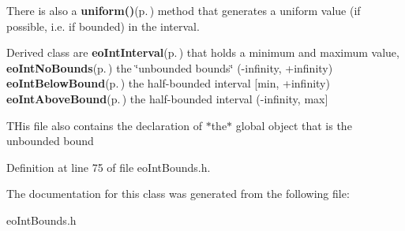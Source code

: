There is also a {\bf uniform()}{\rm (p.\,\pageref{classeo_int_bounds_a13})} method that generates a uniform value (if possible, i.e. if bounded) in the interval.

Derived class are {\bf eo\-Int\-Interval}{\rm (p.\,\pageref{classeo_int_interval})} that holds a minimum and maximum value, {\bf eo\-Int\-No\-Bounds}{\rm (p.\,\pageref{classeo_int_no_bounds})} the \char`\"{}unbounded bounds\char`\"{} (-infinity, +infinity) {\bf eo\-Int\-Below\-Bound}{\rm (p.\,\pageref{classeo_int_below_bound})} the half-bounded interval [min, +infinity) {\bf eo\-Int\-Above\-Bound}{\rm (p.\,\pageref{classeo_int_above_bound})} the half-bounded interval (-infinity, max]

THis file also contains the declaration of $\ast$the$\ast$ global object that is the unbounded bound 



Definition at line 75 of file eo\-Int\-Bounds.h.

The documentation for this class was generated from the following file:\begin{CompactItemize}
\item 
eo\-Int\-Bounds.h\end{CompactItemize}
